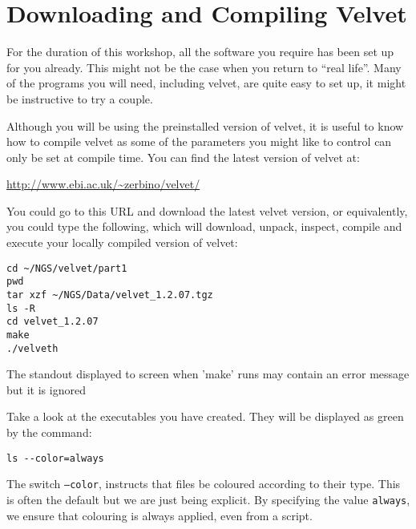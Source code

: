 \section{Downloading and Compiling Velvet}
\begin{note}
For the duration of this workshop, all the software you require has been set up
for you already. This might not be the case when you return to ``real life''. Many
of the programs you will need, including velvet, are quite easy to set up, it
might be instructive to try a couple.
\end{note}

\begin{information}
Although you will be using the preinstalled version of velvet, it is useful to
know how to compile velvet as some of the parameters you might like to control
can only be set at compile time. You can find the latest version of velvet at:

{\centering
\url{http://www.ebi.ac.uk/~zerbino/velvet/}
 
}

You could go to this URL and download the latest velvet version, or
equivalently, you could type the following, which will download, unpack,
inspect, compile and execute your locally compiled version of velvet:
\begin{lstlisting}
cd ~/NGS/velvet/part1
pwd
tar xzf ~/NGS/Data/velvet_1.2.07.tgz
ls -R
cd velvet_1.2.07
make
./velveth
\end{lstlisting}
The standout displayed to screen when 'make' runs may contain an error message but it is ignored
\end{information}

\begin{steps}
Take a look at the executables you have created. They will be displayed as green
by the command:
\begin{lstlisting}
ls --color=always
\end{lstlisting}
\end{steps}

\begin{note}
The switch \texttt{--color}, instructs that files be coloured according to their
type. This is often the default but we are just being explicit. By specifying
the value \texttt{always}, we ensure that colouring is always applied, even from
a script.
\end{note}

